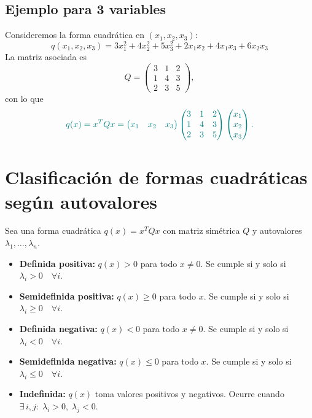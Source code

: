\documentclass{article}
\begin{document}
\subsection*{Ejemplo para 3 variables}
Consideremos la forma cuadrática en \((x_1,x_2,x_3)\):
\[
q(x_1,x_2,x_3)
= 3x_1^2 + 4x_2^2 + 5x_3^2
+ 2x_1x_2 + 4x_1x_3 + 6x_2x_3
\]
La matriz asociada es
\[
Q = \begin{pmatrix}
3 & 1 & 2\\
1 & 4 & 3\\
2 & 3 & 5
\end{pmatrix},
\]
con lo que
\[\color{teal}
q(x) = x^T Q x
= \begin{pmatrix}x_1 & x_2 & x_3\end{pmatrix}
\begin{pmatrix}
3 & 1 & 2\\
1 & 4 & 3\\
2 & 3 & 5
\end{pmatrix}
\begin{pmatrix}x_1\\ x_2\\ x_3\end{pmatrix}.
\]


\section*{Clasificación de formas cuadráticas según autovalores}

Sea una forma cuadrática \(q(x)=x^T Q x\) con matriz simétrica \(Q\) y autovalores \(\lambda_1,\dots,\lambda_n\).

\begin{itemize}
  \item \textbf{Definida positiva:} \(q(x)>0\) para todo \(x\neq0\). Se cumple si y solo si
  \(
    \lambda_i>0 \quad\forall i
  \).

  \item \textbf{Semidefinida positiva:} \(q(x)\ge0\) para todo \(x\). Se cumple si y solo si
  \(
    \lambda_i\ge0 \quad\forall i
  \).

  \item \textbf{Definida negativa:} \(q(x)<0\) para todo \(x\neq0\). Se cumple si y solo si
  \(
    \lambda_i<0 \quad\forall i
  \).

  \item \textbf{Semidefinida negativa:} \(q(x)\le0\) para todo \(x\). Se cumple si y solo si
  \(
    \lambda_i\le0 \quad\forall i
  \).

  \item \textbf{Indefinida:} \(q(x)\) toma valores positivos y negativos. Ocurre cuando
  \(
    \exists\,i,j:\;\lambda_i>0,\;\lambda_j<0
  \).
\end{itemize}
\end{document}
